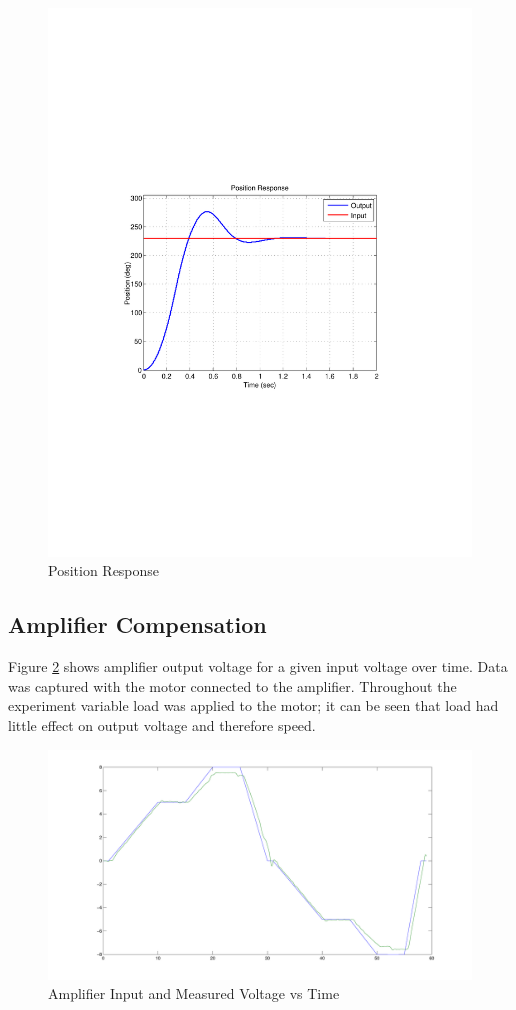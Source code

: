 \begin{figure}[ht]
    \centering
    \includegraphics[width=.99\textwidth]{images/response.pdf}
    \caption{Position Response}
    \label{fig:positionresponse}
\end{figure}

\subsection{Amplifier Compensation}

Figure \ref{fig:amp} shows amplifier output voltage for a given input voltage over time.
Data was captured with the motor connected to the amplifier.
Throughout the experiment variable load was applied to the motor; it can be seen that load had little effect on output voltage and therefore speed.

\begin{figure}[ht]
    \centering
    \includegraphics[width=.99\textwidth]{images/amplifier.pdf}
    \caption{Amplifier Input and Measured Voltage vs Time}
    \label{fig:amp}
\end{figure}
